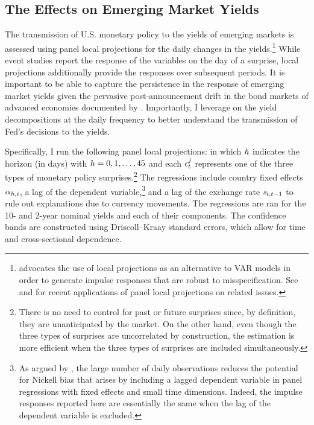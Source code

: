 {\subsection{The Effects on Emerging Market Yields} \label{sec:LPs} 
\iftoggle{toclinks}{\gototoc}{} %

The transmission of U.S. monetary policy to the yields of emerging markets is assessed using panel local projections for the daily changes in the yields.\footnote{\cite{Jorda:2005} advocates the use of local projections as an alternative to VAR models in order to generate impulse responses that are robust to misspecification. See \cite{ACDM:2019} and \cite{HofmannShimShin:2020} for recent applications of panel local projections on related issues.} 
While event studies report the response of the variables on the day of a surprise, local projections additionally provide the responses over subsequent periods. 
It is important to be able to capture the persistence in the response of emerging market yields given the pervasive post-announcement drift in the bond markets of advanced economies documented by \cite{BrooksKatzLustig:2019}. 
Importantly, I leverage on the yield decompositions at the daily frequency to better understand the transmission of Fed's decisions to the yields. 

Specifically, I run the following panel local projections:
\noindent in which \(h\) indicates the horizon (in days) with \(h = 0, 1, \ldots, 45\) and each \(\epsilon^{j}_{t}\) represents one of the three types of monetary policy surprises.\footnote{ There is no need to control for past or future surprises since, by definition, they are unanticipated by the market. On the other hand, even though the three types of surprises are uncorrelated by construction, the estimation is more efficient when the three types of surprises are included simultaneously.} 
The regressions include country fixed effects \(\alpha_{h,i}\), a lag of the dependent variable,\footnote{ As argued by \cite{HofmannShimShin:2020}, the large number of daily observations reduces the potential for Nickell bias that arises by including a lagged dependent variable in panel regressions with fixed effects and small time dimensions. Indeed, the impulse responses reported here are essentially the same when the lag of the dependent variable is excluded.} and a lag of the exchange rate \(\mathit{s}_{i,{t-1}}\) to rule out explanations due to currency movements. 
The regressions are ran for the 10- and 2-year nominal yields and each of their components.
The confidence bands are constructed using Driscoll--Kraay standard errors, which allow for time and cross-sectional dependence.

}
